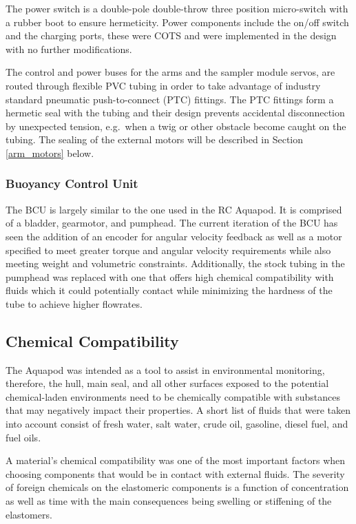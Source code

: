     The power switch is a double-pole double-throw three position micro-switch
    with a rubber boot to ensure hermeticity. Power components include the
    on/off switch and the charging ports, these were COTS and were implemented
    in the design with no further modifications.

    The control and power buses for the arms and the sampler module servos, are
    routed through flexible PVC tubing in order to take advantage of industry
    standard pneumatic push-to-connect (PTC) fittings.  The PTC fittings form a
    hermetic seal with the tubing and their design prevents accidental
    disconnection by unexpected tension, e.g.\ when a twig or other obstacle
    become caught on the tubing. The sealing of the external motors will be
    described in Section \ref{arm_motors} below.

  \subsubsection{Buoyancy Control Unit} The BCU is largely similar to the one
  used in the RC Aquapod. It is comprised of a bladder, gearmotor, and pumphead.
  The current iteration of the BCU has seen the addition of an encoder for
  angular velocity feedback as well as a motor specified to meet greater torque
  and angular velocity requirements while also meeting weight and volumetric
  constraints.  Additionally, the stock tubing in the pumphead was replaced with
  one that offers high chemical compatibility with fluids which it could
  potentially contact while minimizing the hardness of the tube to achieve
  higher flowrates.

  \subsection{Chemical Compatibility} The Aquapod was intended as a tool to
  assist in environmental monitoring, therefore, the hull, main seal, and all
  other surfaces exposed to the potential chemical-laden environments need to be
  chemically compatible with substances that may negatively impact their
  properties. A short list of fluids that were taken into account consist of
  fresh water, salt water, crude oil, gasoline, diesel fuel, and fuel oils.

  A material's chemical compatibility was one of the most important factors
  when choosing components that would be in contact with external fluids.
  The severity of foreign chemicals on the elastomeric components is a
  function of concentration as well as time with the main consequences being
  swelling or stiffening of the elastomers.

